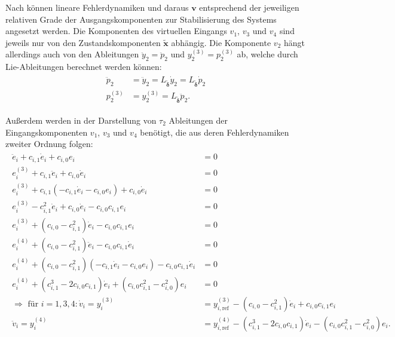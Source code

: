 Nach \cite[S. 208]{NLRT_Roebenack} können lineare Fehlerdynamiken und daraus $\mathbf{v}$ entsprechend der jeweiligen relativen Grade der Ausgangskomponenten zur Stabilisierung des Systems angesetzt werden. Die Komponenten des virtuellen Eingangs $v_1$, $v_3$ und $v_4$ sind jeweils nur von den Zustandskomponenten $\tilde{\mathbf{x}}$ abhängig. Die Komponente $v_2$ hängt allerdings auch von den Ableitungen $\ddot{y}_2 = \ddot{p}_2$ und $y_2^{(3)} = p_2^{(3)}$ ab, welche durch Lie-Ableitungen berechnet werden können:
\begin{align}
	\label{eq:p2_derivs_Lie}
	\begin{split}
		\ddot{p}_2 &= \ddot{y}_2 = L_{\tilde{\boldsymbol{\delta}}} \dot{y}_2 = L_{\tilde{\boldsymbol{\delta}}} \dot{p}_2 \\
		p_2^{(3)} &= y_2^{(3)} = L_{\tilde{\boldsymbol{\delta}}} \ddot{p}_2.
	\end{split}
\end{align}

Außerdem werden in der Darstellung von $\tau_2$ Ableitungen der Eingangskomponenten $v_1$, $v_3$ und $v_4$ benötigt, die aus deren Fehlerdynamiken zweiter Ordnung folgen:
\begin{align}
	\begin{split}
	    \ddot{e}_i + c_{i,1} \dot{e}_i + c_{i, 0} e_i &= 0 \\
		e_i^{(3)} + c_{i, 1} \ddot{e}_i + c_{i, 0} \dot{e}_i &= 0 \\
		e_i^{(3)} + c_{i, 1} (-c_{i, 1} \dot{e}_i - c_{i, 0} e_i) + c_{i, 0} \dot{e}_i &= 0 \\
		e_i^{(3)} - c_{i, 1}^2 \dot{e}_i + c_{i, 0} \dot{e}_i - c_{i, 0} c_{i, 1} e_i &= 0 \\
		e_i^{(3)} + (c_{i, 0} - c_{i, 1}^2) \dot{e}_i - c_{i, 0} c_{i, 1} e_i &= 0 \\
		e_i^{(4)} + (c_{i, 0} - c_{i, 1}^2) \ddot{e}_i - c_{i, 0} c_{i, 1} \dot{e}_i &= 0 \\
		e_i^{(4)} + (c_{i, 0} - c_{i, 1}^2) (-c_{i, 1} \dot{e}_i - c_{i, 0} e_i) - c_{i, 0} c_{i, 1} \dot{e}_i &= 0 \\
		e_i^{(4)} + (c_{i, 1}^3 - 2 c_{i, 0} c_{i, 1}) \dot{e}_i + (c_{i, 0} c_{i, 1}^2 - c_{i, 0}^2) e_i &= 0 \\
		\Rightarrow \text{ für } i = 1,3,4: \dot{v}_i = y_i^{(3)} &= y_{i, \text{ref}}^{(3)} - (c_{i, 0} - c_{i, 1}^2) \dot{e}_i + c_{i, 0} c_{i, 1} e_i \\
		\ddot{v}_i = y_i^{(4)} &= y_{i, \text{ref}}^{(4)} - (c_{i, 1}^3 - 2 c_{i, 0} c_{i, 1}) \dot{e}_i - (c_{i, 0} c_{i, 1}^2 - c_{i, 0}^2) e_i.
	\end{split}
\end{align}

